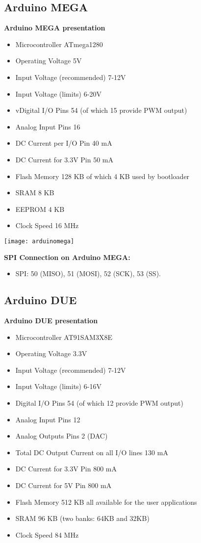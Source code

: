 \documentclass[10pt,a4paper]{report}
\begin{document}
\subsection*{Arduino MEGA}

\textbf{Arduino MEGA presentation}\\
\begin{itemize}
\item Microcontroller	ATmega1280
\item Operating Voltage	5V
\item Input Voltage (recommended)	7-12V
\item Input Voltage (limits)	6-20V
\item vDigital I/O Pins	54 (of which 15 provide PWM output)
\item Analog Input Pins	16
\item DC Current per I/O Pin	40 mA
\item DC Current for 3.3V Pin	50 mA
\item Flash Memory	128 KB of which 4 KB used by bootloader
\item SRAM	8 KB
\item EEPROM	4 KB
\item Clock Speed	16 MHz
\end{itemize}
\begin{center}
\texttt{[image: arduinomega]}\\
\end{center}
\textbf{SPI Connection on Arduino MEGA:}
\begin{itemize}
\item SPI: 50 (MISO), 51 (MOSI), 52 (SCK), 53 (SS).
\end{itemize}

\subsection{Arduino DUE}

\textbf{Arduino DUE presentation}\\
\begin{itemize}
\item Microcontroller	 	AT91SAM3X8E
\item Operating Voltage	 	3.3V
\item Input Voltage (recommended)	 	7-12V
\item Input Voltage (limits)	 	6-16V
\item Digital I/O Pins	 	54 (of which 12 provide PWM output)
\item Analog Input Pins	 	12
\item Analog Outputs Pins	 	2 (DAC)
\item Total DC Output Current on all I/O lines	 	130 mA
\item DC Current for 3.3V Pin	 	800 mA
\item DC Current for 5V Pin	 	800 mA
\item Flash Memory	 	512 KB all available for the user applications
\item SRAM	 	96 KB (two banks: 64KB and 32KB)
\item Clock Speed	 	84 MHz
\end{itemize}
\end{document}
